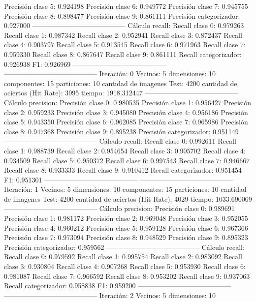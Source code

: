 Precisión clase 5: 0.924198
Precisión clase 6: 0.949772
Precisión clase 7: 0.945755
Precisión clase 8: 0.898477
Precisión clase 9: 0.861111
Precisión categorizador: 0.927000
-----------------------------------------
Cálculo recall: 
Recall clase 0: 0.979263
Recall clase 1: 0.987342
Recall clase 2: 0.952941
Recall clase 3: 0.872437
Recall clase 4: 0.903797
Recall clase 5: 0.913545
Recall clase 6: 0.971963
Recall clase 7: 0.959330
Recall clase 8: 0.867647
Recall clase 9: 0.861111
Recall categorizador: 0.926938
F1: 0.926969
-----------------------------------------
-----------------------------------------
Iteración: 0
Vecinos: 5
dimensiones: 10
componentes: 15
particiones: 10
cantidad de imagenes Test: 4200
cantidad de aciertos (Hit Rate): 3995
tiempo: 1918.312447
-----------------------------------------
Cálculo precision: 
Precisión clase 0: 0.980535
Precisión clase 1: 0.956427
Precisión clase 2: 0.959233
Precisión clase 3: 0.945080
Precisión clase 4: 0.956186
Precisión clase 5: 0.943350
Precisión clase 6: 0.962085
Precisión clase 7: 0.965986
Precisión clase 8: 0.947368
Precisión clase 9: 0.895238
Precisión categorizador: 0.951149
-----------------------------------------
Cálculo recall: 
Recall clase 0: 0.992611
Recall clase 1: 0.988739
Recall clase 2: 0.954654
Recall clase 3: 0.905702
Recall clase 4: 0.934509
Recall clase 5: 0.950372
Recall clase 6: 0.997543
Recall clase 7: 0.946667
Recall clase 8: 0.933333
Recall clase 9: 0.910412
Recall categorizador: 0.951454
F1: 0.951301
-----------------------------------------
-----------------------------------------
Iteración: 1
Vecinos: 5
dimensiones: 10
componentes: 15
particiones: 10
cantidad de imagenes Test: 4200
cantidad de aciertos (Hit Rate): 4029
tiempo: 1033.690069
-----------------------------------------
Cálculo precision: 
Precisión clase 0: 0.989691
Precisión clase 1: 0.981172
Precisión clase 2: 0.969048
Precisión clase 3: 0.952055
Precisión clase 4: 0.960212
Precisión clase 5: 0.959128
Precisión clase 6: 0.967366
Precisión clase 7: 0.973094
Precisión clase 8: 0.948529
Precisión clase 9: 0.895323
Precisión categorizador: 0.959562
-----------------------------------------
Cálculo recall: 
Recall clase 0: 0.979592
Recall clase 1: 0.995754
Recall clase 2: 0.983092
Recall clase 3: 0.930804
Recall clase 4: 0.907268
Recall clase 5: 0.953930
Recall clase 6: 0.981087
Recall clase 7: 0.966592
Recall clase 8: 0.953202
Recall clase 9: 0.937063
Recall categorizador: 0.958838
F1: 0.959200
-----------------------------------------
-----------------------------------------
Iteración: 2
Vecinos: 5
dimensiones: 10
